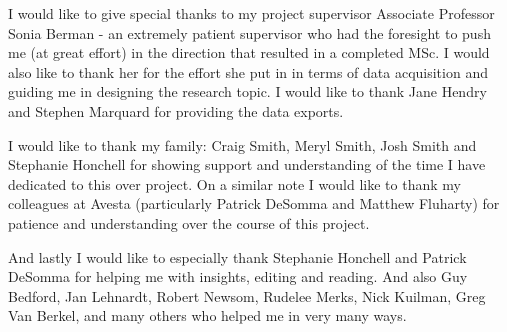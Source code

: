 I would like to give special thanks to my project supervisor Associate Professor Sonia Berman - an extremely patient supervisor who had the foresight to push me (at great effort) in the direction that resulted in a completed MSc. I would also like to thank her for the effort she put in in terms of data acquisition and guiding me in designing the research topic. I would like to thank Jane Hendry and Stephen Marquard for providing the data exports.

I would like to thank my family: Craig Smith, Meryl Smith, Josh Smith and Stephanie Honchell for showing support and understanding of the time I have dedicated to this over project. On a similar note I would like to thank my colleagues at Avesta (particularly Patrick DeSomma and Matthew Fluharty) for patience and understanding over the course of this project.

And lastly I would like to especially thank Stephanie Honchell and Patrick DeSomma for helping me with insights, editing and reading. And also Guy Bedford, Jan Lehnardt, Robert Newsom, Rudelee Merks, Nick Kuilman, Greg Van Berkel, and many others who helped me in very many ways.